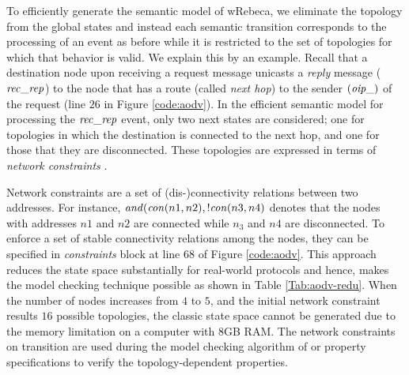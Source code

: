 To efficiently generate the semantic model of wRebeca, %
we eliminate the topology from the global states and instead %
each semantic transition corresponds to the processing of an event as before while it is restricted to the set of topologies for which that behavior is valid.  We explain this by an example. Recall that a destination node upon receiving a request message unicasts a \emph{reply} message (${\it rec\_rep}$) to the node that has a route (called \emph{next hop}) to the sender $({\it oip\_})$ of the request (line $26$ in Figure \ref{code:aodv}). In the efficient semantic model for processing the ${\it rec\_rep}$ event, only two next states are considered; one for topologies in which the destination is connected to the next hop, and one for those that they are disconnected. These topologies are expressed in terms of \emph{network constraints} \cite{FatemehFI10,FatemehFI19}. 

Network constraints are a set of (dis-)connectivity relations between two addresses. For instance, ${\it and}({\it con}(n1,n2),!{\it con}(n3,n4)$ denotes that the nodes with addresses $n1$ and $n2$ are connected while $n_3$ and $n4$ are disconnected. To enforce a set of stable connectivity relations among the nodes, they can be specified in \emph{constraints} block at line $68$ of Figure \ref{code:aodv}. This approach reduces the state space substantially for real-world protocols and hence, makes the model checking technique possible as shown in Table \ref{Tab:aodv-redu}. When the number of nodes increases from $4$ to $5$, and the initial network constraint results $16$ possible topologies, the classic state space cannot be generated due to the memory limitation on a computer with 8GB RAM. The network constraints on transition are used during the model checking algorithm of \cite{FORM} or property specifications \cite{CSI2018} to verify the topology-dependent properties. 

